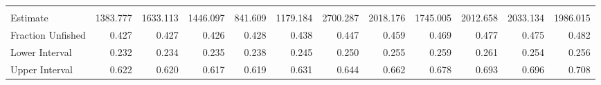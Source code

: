 \documentclass[11pt,
  english,
  a4paper,
]{article}
\begin{document}
\begin{table}[H]
{\begin{tabular}[t]{lrrrrrrrrrrr}
\addlinespace[0.3em]
\multicolumn{12}{l}{\textbf{Fraction Unfished}}\\
\hspace{1em}Estimate & 1383.777 & 1633.113 & 1446.097 & 841.609 & 1179.184 & 2700.287 & 2018.176 & 1745.005 & 2012.658 & 2033.134 & 1986.015\\
\hspace{1em}Fraction Unfished & 0.427 & 0.427 & 0.426 & 0.428 & 0.438 & 0.447 & 0.459 & 0.469 & 0.477 & 0.475 & 0.482\\
\hspace{1em}Lower Interval & 0.232 & 0.234 & 0.235 & 0.238 & 0.245 & 0.250 & 0.255 & 0.259 & 0.261 & 0.254 & 0.256\\
Upper Interval & 0.622 & 0.620 & 0.617 & 0.619 & 0.631 & 0.644 & 0.662 & 0.678 & 0.693 & 0.696 & 0.708\\
\bottomrule
\end{tabular}}
\end{table}
\end{document}
